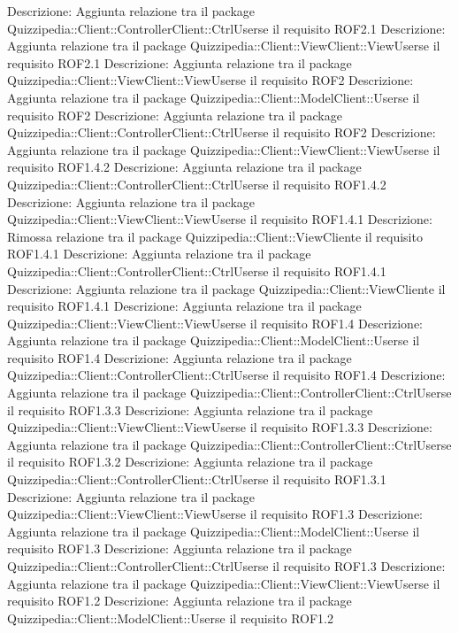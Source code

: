 Descrizione: Aggiunta relazione tra il package Quizzipedia::Client::ControllerClient::CtrlUserse il requisito ROF2.1 
Descrizione: Aggiunta relazione tra il package Quizzipedia::Client::ViewClient::ViewUserse il requisito ROF2.1 
Descrizione: Aggiunta relazione tra il package Quizzipedia::Client::ViewClient::ViewUserse il requisito ROF2 
Descrizione: Aggiunta relazione tra il package Quizzipedia::Client::ModelClient::Userse il requisito ROF2 
Descrizione: Aggiunta relazione tra il package Quizzipedia::Client::ControllerClient::CtrlUserse il requisito ROF2 
Descrizione: Aggiunta relazione tra il package Quizzipedia::Client::ViewClient::ViewUserse il requisito ROF1.4.2 
Descrizione: Aggiunta relazione tra il package Quizzipedia::Client::ControllerClient::CtrlUserse il requisito ROF1.4.2 
Descrizione: Aggiunta relazione tra il package Quizzipedia::Client::ViewClient::ViewUserse il requisito ROF1.4.1 
Descrizione: Rimossa relazione tra il package Quizzipedia::Client::ViewCliente il requisito ROF1.4.1 
Descrizione: Aggiunta relazione tra il package Quizzipedia::Client::ControllerClient::CtrlUserse il requisito ROF1.4.1 
Descrizione: Aggiunta relazione tra il package Quizzipedia::Client::ViewCliente il requisito ROF1.4.1 
Descrizione: Aggiunta relazione tra il package Quizzipedia::Client::ViewClient::ViewUserse il requisito ROF1.4 
Descrizione: Aggiunta relazione tra il package Quizzipedia::Client::ModelClient::Userse il requisito ROF1.4 
Descrizione: Aggiunta relazione tra il package Quizzipedia::Client::ControllerClient::CtrlUserse il requisito ROF1.4 
Descrizione: Aggiunta relazione tra il package Quizzipedia::Client::ControllerClient::CtrlUserse il requisito ROF1.3.3 
Descrizione: Aggiunta relazione tra il package Quizzipedia::Client::ViewClient::ViewUserse il requisito ROF1.3.3 
Descrizione: Aggiunta relazione tra il package Quizzipedia::Client::ControllerClient::CtrlUserse il requisito ROF1.3.2 
Descrizione: Aggiunta relazione tra il package Quizzipedia::Client::ControllerClient::CtrlUserse il requisito ROF1.3.1 
Descrizione: Aggiunta relazione tra il package Quizzipedia::Client::ViewClient::ViewUserse il requisito ROF1.3 
Descrizione: Aggiunta relazione tra il package Quizzipedia::Client::ModelClient::Userse il requisito ROF1.3 
Descrizione: Aggiunta relazione tra il package Quizzipedia::Client::ControllerClient::CtrlUserse il requisito ROF1.3 
Descrizione: Aggiunta relazione tra il package Quizzipedia::Client::ViewClient::ViewUserse il requisito ROF1.2 
Descrizione: Aggiunta relazione tra il package Quizzipedia::Client::ModelClient::Userse il requisito ROF1.2 
